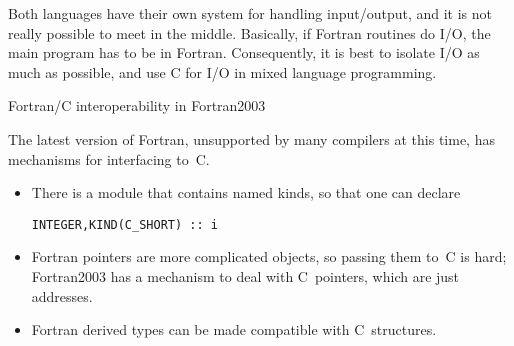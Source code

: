 Both languages have their own system for handling input/output, and it
is not really possible to meet in the middle. Basically, if Fortran
routines do I/O, the main program has to be in Fortran. Consequently,
it is best to isolate I/O as much as possible, and use C for I/O in
mixed language programming.

 {Fortran/C interoperability in Fortran2003}

The latest version of Fortran, unsupported by many compilers at this
time, has mechanisms for interfacing to~C.
\begin{itemize}
\item There is a module that contains named kinds, so that one can declare
\begin{verbatim}
INTEGER,KIND(C_SHORT) :: i
\end{verbatim}
\item Fortran pointers are more complicated objects, so passing them
  to~C is hard; Fortran2003 has a mechanism to deal with C~pointers,
  which are just addresses.
\item Fortran derived types can be made compatible with C~structures.
\end{itemize}
